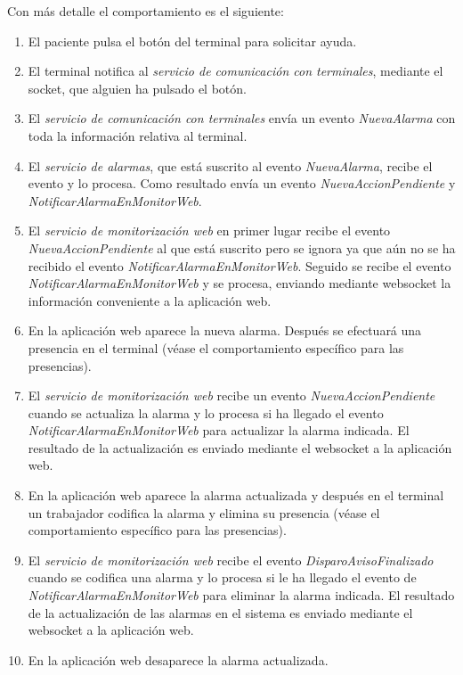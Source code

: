 Con más detalle el comportamiento es el siguiente:
\begin{enumerate}
	\item El paciente pulsa el botón del terminal para solicitar ayuda.	
	\item El terminal notifica al \textit{servicio de comunicación con terminales}, mediante el socket, que alguien ha pulsado el botón.
	\item El \textit{servicio de comunicación con terminales} envía un evento \textit{NuevaAlarma} con toda la información relativa al terminal.
	\item El \textit{servicio de alarmas}, que está suscrito al evento \textit{NuevaAlarma}, recibe el evento y lo procesa. Como resultado envía un evento \textit{NuevaAccionPendiente} y \textit{NotificarAlarmaEnMonitorWeb}.
	\item El \textit{servicio de monitorización web} en primer lugar recibe el evento \textit{NuevaAccionPendiente} al que está suscrito pero se ignora ya que aún no se ha recibido el evento \textit{NotificarAlarmaEnMonitorWeb}. Seguido se recibe el evento \textit{NotificarAlarmaEnMonitorWeb} y se procesa, enviando mediante websocket la información conveniente a la aplicación web.
	\item En la aplicación web aparece la nueva alarma. Después se efectuará una presencia en el terminal (véase el comportamiento específico para las presencias).
	\item El \textit{servicio de monitorización web} recibe un evento \textit{NuevaAccionPendiente} cuando se actualiza la alarma y lo procesa si ha llegado el evento \textit{NotificarAlarmaEnMonitorWeb} para actualizar la alarma indicada. El resultado de la actualización es enviado mediante el websocket a la aplicación web.
	\item En la aplicación web aparece la alarma actualizada y después en el terminal un trabajador codifica la alarma y elimina su presencia (véase el comportamiento específico para las presencias).
	\item El \textit{servicio de monitorización web} recibe el evento \textit{DisparoAvisoFinalizado} cuando se codifica una alarma y lo procesa si le ha llegado el evento de \textit{NotificarAlarmaEnMonitorWeb} para eliminar la alarma indicada. El resultado de la actualización de las alarmas en el sistema es enviado mediante el websocket a la aplicación web.
	\item En la aplicación web desaparece la alarma actualizada.
\end{enumerate}


